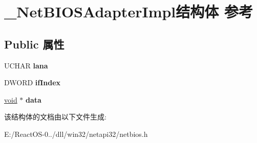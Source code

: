 \hypertarget{struct___net_b_i_o_s_adapter_impl}{}\section{\+\_\+\+Net\+B\+I\+O\+S\+Adapter\+Impl结构体 参考}
\label{struct___net_b_i_o_s_adapter_impl}
\subsection*{Public 属性}
\begin{DoxyCompactItemize}
\item 
\mbox{\label{struct___net_b_i_o_s_adapter_impl_a5735b09764a1b57fa61de09124fa32a3}} 
U\+C\+H\+AR {\bfseries lana}
\item 
\mbox{\label{struct___net_b_i_o_s_adapter_impl_aa1b722be2b4933427305472bb145eb83}} 
D\+W\+O\+RD {\bfseries if\+Index}
\item 
\mbox{\label{struct___net_b_i_o_s_adapter_impl_ac65037f9b25a98ffaac493ecb9af12c7}} 
\hyperlink{interfacevoid}{void} $\ast$ {\bfseries data}
\end{DoxyCompactItemize}


该结构体的文档由以下文件生成\+:\begin{DoxyCompactItemize}
\item 
E\+:/\+React\+O\+S-\/0../dll/win32/netapi32/netbios.\+h\end{DoxyCompactItemize}
